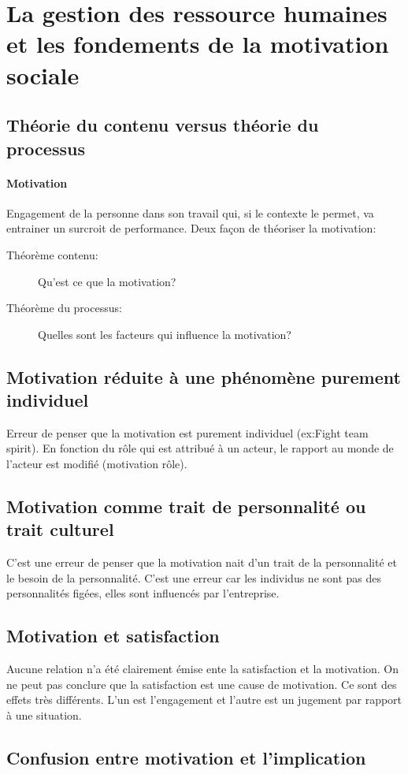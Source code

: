 \documentclass[11pt]{article} %
\begin{document}
\section{La gestion des ressource humaines et les fondements de la motivation sociale}
	\subsection{Théorie du contenu versus théorie du processus}
		\paragraph{Motivation} Engagement de la personne dans son travail qui, si le contexte le permet, va
		entrainer un surcroit de performance.
		Deux façon de théoriser la motivation:
		\begin{description}
			\item[Théorème contenu: ] Qu'est ce que la motivation?
			\item[Théorème du processus: ] Quelles sont les facteurs qui influence la motivation?
		\end{description}
	\subsection{Motivation réduite à une phénomène purement individuel}
		Erreur de penser que la motivation est purement individuel (ex:Fight team spirit). En fonction du
		rôle qui est attribué à un acteur, le rapport au monde de l'acteur est modifié (motivation rôle).
	\subsection{Motivation comme trait de personnalité ou trait culturel}
		C'est une erreur de penser que la motivation nait d'un trait de la personnalité et le besoin de la 
		personnalité. C'est une erreur car les individus ne sont pas des personnalités figées, elles sont 	
		influencés par l'entreprise.
	\subsection{Motivation et satisfaction}
		Aucune relation n'a été clairement émise ente la satisfaction et la motivation. On ne peut pas conclure 
		que la satisfaction est une cause de motivation. Ce sont des effets très différents. L'un est 
		l'engagement et l'autre est un jugement par rapport à une situation.
	\subsection{Confusion entre motivation et l'implication}
\end{document}
